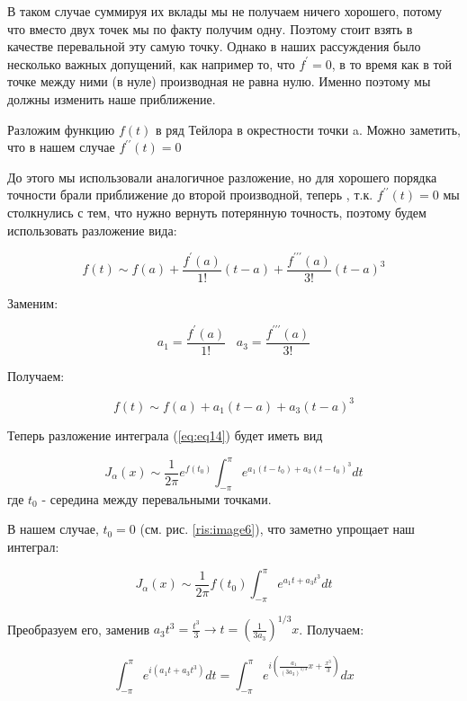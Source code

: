 \documentclass[14pt]{extarticle}
\begin{document}
В таком случае суммируя их вклады мы не получаем ничего хорошего, потому что вместо двух точек мы по факту получим одну. Поэтому стоит взять в качестве перевальной эту самую точку. Однако в наших рассуждения было несколько важных допущений, как например то, что $f^{\prime} = 0$, в то время как в той точке между ними (в нуле) производная не равна нулю. Именно поэтому мы должны изменить наше приближение.

Разложим функцию $f(t)$ в ряд Тейлора в окрестности точки a. Можно заметить, что в нашем случае  $f^{\prime\prime}(t) = 0$

До этого мы использовали аналогичное разложение, но для хорошего порядка точности брали приближение до второй производной, теперь , т.к. $f^{\prime\prime}(t) = 0$ мы столкнулись с тем, что нужно вернуть потерянную точность, поэтому будем использовать разложение вида:

\begin{equation}\label{eq:eq17}
f(t) \sim f(a) + \frac{f^{\prime}(a)}{1!}(t-a) + \frac{f^{\prime\prime\prime}(a)}{3!}(t-a)^3
\end{equation}

Заменим:

$$
a_1 = \frac{f^{\prime}(a)}{1!} \;\;\; a_3 = \frac{f^{\prime\prime\prime}(a)}{3!}
$$

Получаем:
  
\begin{equation}\label{eq:eq18}
f(t) \sim f(a) + a_1(t-a) + a_3(t-a)^3
\end{equation}
  
Теперь разложение интеграла (\ref{eq:eq14}) будет иметь вид

\begin{equation}\nonumber
J_\alpha(x) \sim \frac{1}{2\pi} e^{f(t_0)} \int_{-\pi}^{\pi}e^{a_1(t-t_0) + a_3(t-t_0)^3}dt
\end{equation}
где $t_0$ - середина между перевальными точками.

В нашем случае, $t_0=0$ (см. рис. \ref{ris:image6}), что заметно упрощает наш интеграл:

\begin{equation}\nonumber
J_\alpha(x) \sim \frac{1}{2\pi} f(t_0) \int_{-\pi}^{\pi}e^{a_1 t + a_3 t^3}dt
\end{equation}
  
Преобразуем его, заменив $a_3t^3 = \frac{t^3}{3} \rightarrow t = \left(\frac{1}{3a_3}\right)^{1/3}x$. Получаем:

\begin{equation}\nonumber
\int_{-\pi}^{\pi}e^{i\left(a_1 t + a_3 t^3\right)}dt = \int_{-\pi}^{\pi}e^{i\left(\frac{a_1}{(3a_3)^{1/3}}x + \frac{x^3}{3}\right)}dx 
\end{equation}
\end{document}
